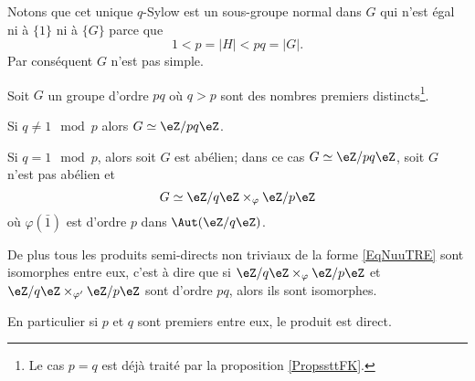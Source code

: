 Notons que cet unique \( q\)-Sylow est un sous-groupe normal dans \( G\) qui n'est égal ni à \( \{ 1 \}\) ni à \( \{ G \}\) parce que
\begin{equation}
    1<p=| H |<pq=| G |.
\end{equation}
Par conséquent \( G\) n'est pas simple.

\begin{theorem} \label{ThoLnTMBy}
    Soit \( G\) un groupe d'ordre \( pq\) où \( q>p\) sont des nombres premiers distincts\footnote{Le cas \( p=q\) est déjà traité par la proposition \ref{PropssttFK}.}. 

    Si \( q\neq 1\mod p\) alors \( G\simeq \eZ/pq\eZ\).

    Si \( q=1\mod p\), alors soit \( G\) est abélien; dans ce cas \( G\simeq \eZ/pq\eZ\), soit \( G\) n'est pas abélien et
    \begin{equation}    \label{EqNuuTRE}
        G\simeq \eZ/q\eZ\times_{\varphi}\eZ/p\eZ
    \end{equation}
    où \( \varphi(\bar 1)\) est d'ordre \( p\) dans \( \Aut(\eZ/q\eZ)\).

    De plus tous les produits semi-directs non triviaux de la forme \eqref{EqNuuTRE} sont isomorphes entre eux, c'est à dire que si \( \eZ/q\eZ\times_{\varphi}\eZ/p\eZ\) et \( \eZ/q\eZ\times_{\varphi'}\eZ/p\eZ\) sont d'ordre \( pq\), alors ils sont isomorphes.

    En particulier si \( p\) et \( q\) sont premiers entre eux, le produit est direct.
\end{theorem}

